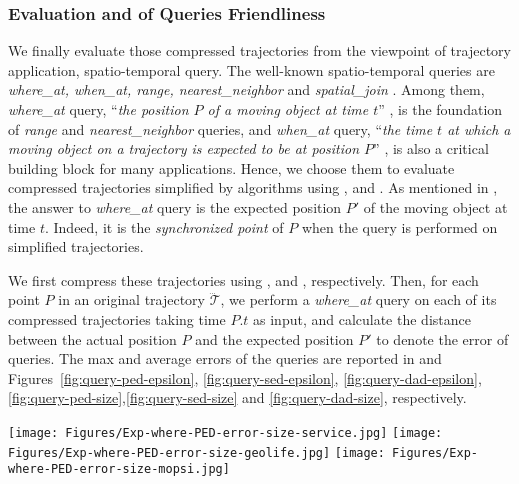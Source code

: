 {%
\subsubsection{{Evaluation and  of Queries Friendliness}}
\label{sec-exp-query}
We finally evaluate those compressed trajectories from the viewpoint of trajectory application, \ie spatio-temporal query. The well-known spatio-temporal queries are \emph{where\_at, when\_at, range, nearest\_neighbor} and \emph{spatial\_join} \cite{Cao:Spatio,Trajcevski:Uncertainty}. Among them, \emph{where\_at} query, \ie ``\emph{the position $P$ of a moving object at time $t$}'' \cite{Cao:Spatio}, is the foundation of \emph{range} and \emph{nearest\_neighbor} queries, {and \emph{when\_at} query, \ie ``\emph{the time $t$ at which a moving object on a trajectory is expected to be at position $P$}'' \cite{Cao:Spatio}, is also a critical building block for many applications.}
{Hence, we choose them to evaluate compressed trajectories simplified by \lsa algorithms using \ped, \sed and \dad.
As mentioned in \cite{Cao:Spatio,Trajcevski:Uncertainty}, the answer to \emph{where\_at} query is the expected position $P'$ of the moving object at time $t$. Indeed, it is the \emph{synchronized point} of $P$ when the query is performed on simplified trajectories.}



{We first compress these trajectories using \ped, \sed and \dad, respectively. }
{Then, for each point $P$ in an original trajectory $\dddot{\mathcal{T}}$, we perform a \emph{where\_at} query on each of its compressed trajectories taking time $P.t$ as input, and calculate the distance between the actual position $P$ and the expected position $P'$ to denote the error of queries.
}
%
{The max and average errors of the queries are reported in  and Figures~\ref{fig:query-ped-epsilon}, \ref{fig:query-sed-epsilon}, \ref{fig:query-dad-epsilon}, \ref{fig:query-ped-size},\ref{fig:query-sed-size} and \ref{fig:query-dad-size}, respectively.}









\begin{figure*}[tb!]
	\centering
	\texttt{[image: Figures/Exp-where-PED-error-size-service.jpg]} 	\hspace{0.5ex}
	\texttt{[image: Figures/Exp-where-PED-error-size-geolife.jpg]}	\hspace{0.5ex}
	\texttt{[image: Figures/Exp-where-PED-error-size-mopsi.jpg]}		
	\vspace{-2ex}
	\caption{\small Evaluation of {\emph{where\_at}} queries (\ped) on small datasets: varying the size of
		trajectories.}
	\label{fig:query-ped-size}
	\vspace{-1ex}
\end{figure*}

}
